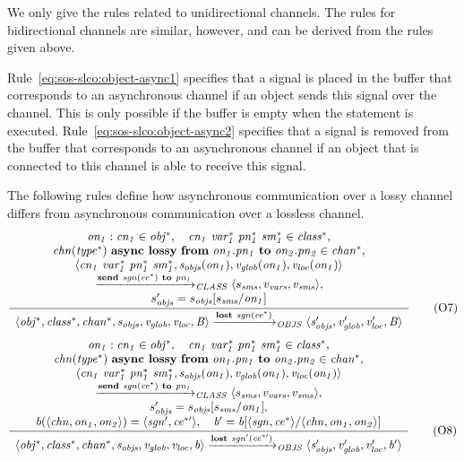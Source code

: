 \noindent
We only give the rules related to unidirectional channels.
The rules for bidirectional channels are similar, however, and can be derived from the rules given above.

Rule~\eqref{eq:sos-slco:object-async1} specifies that a signal is placed in the buffer that corresponds to an asynchronous channel if an object sends this signal over the channel.
This is only possible if the buffer is empty when the statement is executed.
Rule~\eqref{eq:sos-slco:object-async2} specifies that a signal is removed from the buffer that corresponds to an asynchronous channel if an object that is connected to this channel is able to receive this signal.

The following rules define how asynchronous communication over a lossy channel differs from asynchronous communication over a lossless channel.
%
\begin{equation*}
 \frac{ \begin{array}[c]{c} 
\it{on_1}:\it{cn_1} \in \it{obj^*}, \quad
\it{cn_1}~\it{var^*_1}~\it{pn^*_1}~\it{sm^*_1} \in \it{class^*}, \\
\it{chn}(\it{type^*})~\textbf{async lossy}~\textbf{from}~\it{on_1}.\it{pn_1}~\textbf{to}~\it{on_2}.\it{pn_2} \in \it{chan^*}, \\
\langle \it{cn_1}~\it{var^*_1}~\it{pn^*_1}~\it{sm^*_1}, s_{\it{objs}}(\it{on_1}), v_{\it{glob}}(\it{on_1}), v_{\it{loc}}(\it{on_1}) \rangle \\
\xrightarrow{\it{\textbf{send}~\it{sgn}(\it{ce^*})~\textbf{to}~\it{pn_1}}}_{\it{CLASS}}
\langle s_{\it{sms}}, v_{\it{vars}}, v_{\it{sms}} \rangle, \\
s_{\it{objs}}' = s_{\it{objs}}[s_{\it{sms}}/\it{on_1}]
 \end{array} }{ \begin{array}[c]{c} 
\langle \it{obj^*}, \it{class^*}, \it{chan^*}, s_{\it{objs}}, v_{\it{glob}}, v_{\it{loc}}, B \rangle
\xrightarrow{\it{\textbf{lost}~\it{sgn}(\it{ce^*})}}_{\it{OBJS}}
\langle s_{\it{objs}}', v_{\it{glob}}', v_{\it{loc}}', B \rangle
 \end{array} } 
\tag{O7}
\label{eq:sos-slco:object-lossy1}
\end{equation*}
%
\begin{equation*}
 \frac{ \begin{array}[c]{c} 
\it{on_1}:\it{cn_1} \in \it{obj^*}, \quad
\it{cn_1}~\it{var^*_1}~\it{pn^*_1}~\it{sm^*_1} \in \it{class^*}, \\
\it{chn}(\it{type^*})~\textbf{async lossy}~\textbf{from}~\it{on_1}.\it{pn_1}~\textbf{to}~\it{on_2}.\it{pn_2} \in \it{chan^*}, \\
\langle \it{cn_1}~\it{var^*_1}~\it{pn^*_1}~\it{sm^*_1}, s_{\it{objs}}(\it{on_1}), v_{\it{glob}}(\it{on_1}), v_{\it{loc}}(\it{on_1}) \rangle \\
\xrightarrow{\it{\textbf{send}~\it{sgn}(\it{ce^*})~\textbf{to}~\it{pn_1}}}_{\it{CLASS}}
\langle s_{\it{sms}}, v_{\it{vars}}, v_{\it{sms}} \rangle, \\
s_{\it{objs}}' = s_{\it{objs}}[s_{\it{sms}}/\it{on_1}], \\
b(\langle \it{chn}, \it{on_1}, \it{on_2} \rangle) = \langle \it{sgn'}, \it{ce^{*\prime}} \rangle, \quad
b' = b[\langle \it{sgn}, \it{ce^*} \rangle/\langle \it{chn}, \it{on_1}, \it{on_2} \rangle]
 \end{array} }{ \begin{array}[c]{c} 
\langle \it{obj^*}, \it{class^*}, \it{chan^*}, s_{\it{objs}}, v_{\it{glob}}, v_{\it{loc}}, b \rangle
\xrightarrow{\it{\textbf{lost}~\it{sgn'}(\it{ce^{*\prime}})}}_{\it{OBJS}}
\langle s_{\it{objs}}', v_{\it{glob}}', v_{\it{loc}}', b' \rangle
 \end{array} } 
\tag{O8}
\label{eq:sos-slco:object-lossy2}
\end{equation*}

